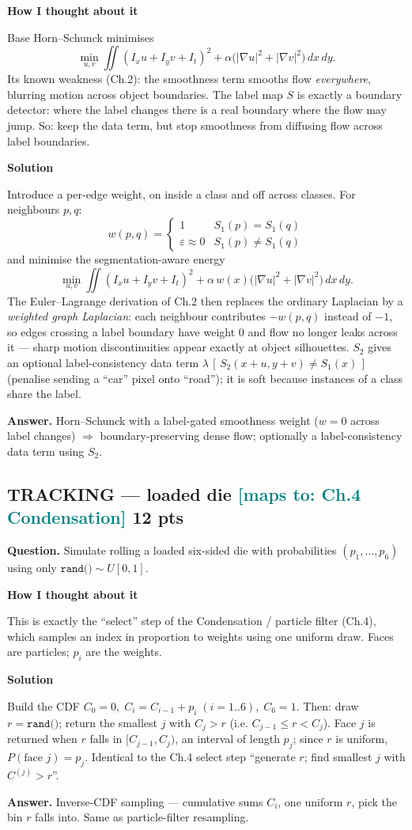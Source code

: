 \documentclass[11pt]{article}
\newcommand{\step}[1]{\smallskip\par\noindent\textbf{\textcolor{amber}{#1}}\par\nobreak}
\newcommand{\maps}[1]{{\small\textcolor{teal}{[maps to: #1]}}}
\newcommand{\ans}[1]{\begin{answer}\textbf{Answer.} #1\end{answer}}
\begin{document}
\step{How I thought about it}
Base Horn--Schunck minimises
\[\min_{u,v}\iint (I_xu+I_yv+I_t)^2+\alpha\big(|\nabla u|^2+|\nabla v|^2\big)\,dx\,dy .\]
Its known weakness (Ch.2): the smoothness term smooths flow \emph{everywhere}, blurring motion across object
boundaries. The label map $S$ is exactly a boundary detector: where the label changes there is a real boundary
where the flow may jump. So: keep the data term, but stop smoothness from diffusing flow across label boundaries.

\step{Solution}
Introduce a per-edge weight, on inside a class and off across classes. For neighbours $p,q$:
\[ w(p,q)=\begin{cases}1 & S_1(p)=S_1(q)\\ \varepsilon\approx 0 & S_1(p)\neq S_1(q)\end{cases} \]
and minimise the segmentation-aware energy
\[\min_{u,v}\iint (I_xu+I_yv+I_t)^2+\alpha\,w(x)\big(|\nabla u|^2+|\nabla v|^2\big)\,dx\,dy .\]
The Euler--Lagrange derivation of Ch.2 then replaces the ordinary Laplacian by a \emph{weighted graph Laplacian}:
each neighbour contributes $-w(p,q)$ instead of $-1$, so edges crossing a label boundary have weight $0$ and flow
no longer leaks across it --- sharp motion discontinuities appear exactly at object silhouettes. $S_2$ gives an
optional label-consistency data term $\lambda\,[\,S_2(x+u,y+v)\neq S_1(x)\,]$ (penalise sending a ``car'' pixel
onto ``road''); it is soft because instances of a class share the label.
\ans{Horn--Schunck with a label-gated smoothness weight ($w=0$ across label changes) $\Rightarrow$
boundary-preserving dense flow; optionally a label-consistency data term using $S_2$.}

\subsection{TRACKING --- loaded die \hfill \maps{Ch.4 Condensation} \hfill \textnormal{\small 12 pts}}
\begin{qbox}\textbf{Question.} Simulate rolling a loaded six-sided die with probabilities $(p_1,\dots,p_6)$ using
only $\texttt{rand()}\sim U[0,1]$.\end{qbox}

\step{How I thought about it}
This is exactly the ``select'' step of the Condensation / particle filter (Ch.4), which samples an index in
proportion to weights using one uniform draw. Faces are particles; $p_i$ are the weights.

\step{Solution}
Build the CDF $C_0=0,\;C_i=C_{i-1}+p_i\;(i=1..6),\;C_6=1$. Then: draw $r=\texttt{rand()}$; return the smallest
$j$ with $C_j>r$ (i.e. $C_{j-1}\le r<C_j$). Face $j$ is returned when $r$ falls in $[C_{j-1},C_j)$, an interval
of length $p_j$; since $r$ is uniform, $P(\text{face }j)=p_j$. Identical to the Ch.4 select step
``generate $r$; find smallest $j$ with $C^{(j)}>r$''.
\ans{Inverse-CDF sampling --- cumulative sums $C_i$, one uniform $r$, pick the bin $r$ falls into. Same as
particle-filter resampling.}
\end{document}
